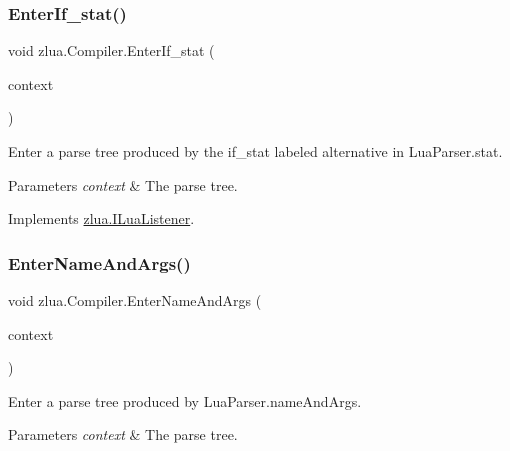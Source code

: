 \subsubsection{\texorpdfstring{Enter\+If\+\_\+stat()}{EnterIf\_stat()}}
{\footnotesize\ttfamily void zlua.\+Compiler.\+Enter\+If\+\_\+stat (\begin{DoxyParamCaption}\item[{\mbox{[}\+Not\+Null\mbox{]} \mbox{\hyperlink{classzlua_1_1_lua_parser_1_1_if__stat_context}{Lua\+Parser.\+If\+\_\+stat\+Context}}}]{context }\end{DoxyParamCaption})}



Enter a parse tree produced by the {\ttfamily if\+\_\+stat} labeled alternative in Lua\+Parser.\+stat. 


\begin{DoxyParams}{Parameters}
{\em context} & The parse tree.\\
\hline
\end{DoxyParams}


Implements \mbox{\hyperlink{interfacezlua_1_1_i_lua_listener_ae4466707d78b9bb5f5836ed8710e4ef1}{zlua.\+I\+Lua\+Listener}}.

\mbox{\label{classzlua_1_1_compiler_a84d43624eeeff6bf6b9f229a8880fe0a}} 
\subsubsection{\texorpdfstring{Enter\+Name\+And\+Args()}{EnterNameAndArgs()}}
{\footnotesize\ttfamily void zlua.\+Compiler.\+Enter\+Name\+And\+Args (\begin{DoxyParamCaption}\item[{\mbox{[}\+Not\+Null\mbox{]} \mbox{\hyperlink{classzlua_1_1_lua_parser_1_1_name_and_args_context}{Lua\+Parser.\+Name\+And\+Args\+Context}}}]{context }\end{DoxyParamCaption})}



Enter a parse tree produced by Lua\+Parser.\+name\+And\+Args. 


\begin{DoxyParams}{Parameters}
{\em context} & The parse tree.\\
\hline
\end{DoxyParams}


